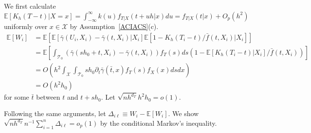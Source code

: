 \documentclass[lettersize, 12pt]{article}
\begin{document}
{We first calculate $\mathbb{E}[K_h(T-t)|X=x] = \int_{-\infty}^\infty k(u) f_{T|X}(t+uh|x) du = f_{T|X}(t|x) + O_p(h^2)$ uniformly over $x \in \mathcal{X}$ by Assumption~\ref{ACIACS}(c).
\begin{align*}
\mathbb{E}[W_i] &= 
\mathbb{E}\left[ \mathbb{E}\left[\bar \gamma(U_i, X_i)
- \bar \gamma(t, X_i)
|X_i\right] 
\mathbb{E}\left[ 1-K_h(T_i -t)/
\bar f(t,X_i)|X_i\right]\right] 
\\&=
\mathbb{E}\left[ 
\int_{\mathcal{T}_0}\left(\bar \gamma(sh_0 + t, X_i)  - \bar \gamma(t, X_i)\right) f_T(s) ds
\left( 1- \mathbb{E}[K_h(T_i -t)|X_i] /\bar f(t,X_i)
\right)
\right] 
\\&
= O\left( h^2 \int_\mathcal{X}
\int_{\mathcal{T}_0} sh_0 \partial_t\bar \gamma(\bar t, x)  f_T(s) 
f_X(x) 
dsdx\right)
\\&= O(h^2h_0)
\end{align*}
for some $\bar t$ between $t$ and $t+sh_0$.
Let $\sqrt{nh^{d_T}}h^2h_0 = o(1)$.


Following the same arguments, let $\Delta_{i\ell} \equiv W_i - \mathbb{E}[W_i]$.
We show $\sqrt{nh^{d_T}} n^{-1}\sum_{i=1}^n \Delta_{i\ell} = o_p(1)$ by the conditional Markov's inequality.  


}
\end{document}
